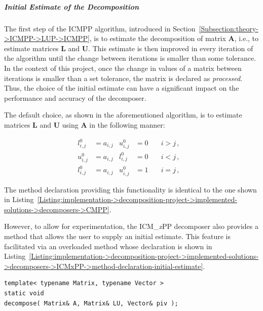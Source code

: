 \subparagraph{Initial Estimate of the Decomposition} The first step of the ICMPP algorithm, introduced in Section~\ref{Subsection:theory->ICMPP->LUP->ICMPP}, is to estimate the decomposition of matrix $\mathbf{A}$, i.e., to estimate matrices $\mathbf{L}$ and $\mathbf{U}$.
This estimate is then improved in every iteration of the algorithm until the change between iterations is smaller than some tolerance.
In the context of this project, once the change in values of a matrix between iterations is smaller than a set tolerance, the matrix is declared as \textit{processed}.
Thus, the choice of the initial estimate can have a significant impact on the performance and accuracy of the decomposer.

The default choice, as shown in the aforementioned algorithm, is to estimate matrices $\mathbf{L}$ and $\mathbf{U}$ using $\mathbf{A}$ in the following manner:

\begin{align}
	l_{i,j}^{0} & = a_{i,j} & u_{i,j}^{0} & = 0 \quad & i > j \nonumber\,, &  \\
	u_{i,j}^{0} & = a_{i,j} & l_{i,j}^{0} & = 0 \quad & i < j \nonumber\,, &  \\
	l_{i,j}^{0} & = a_{i,j} & u_{i,j}^{0} & = 1       & i = j \nonumber\,, &
\end{align}

The method declaration providing this functionality is identical to the one shown in Listing~\ref{Listing:implementation->decomposition-project->implemented-solutions->decomposers->CMPP}.

However, to allow for experimentation, the ICM\_\textit{x}PP decomposer also provides a method that allows the user to supply an initial estimate.
This feature is facilitated via an overloaded method whose declaration is shown in Listing~\ref{Listing:implementation->decomposition-project->implemented-solutions->decomposers->ICMxPP->method-declaration-initial-estimate}.

\begin{lstlisting}[caption={The declaration of the overloaded \code{decompose()} method for the ICM\_\textit{x}PP decomposer that allows the user to supply an initial estimate of the decomposition.
On input, matrix \code{A} is assumed to contain the values of $\mathbf{A}$, matrix \code{LU} is assumed to contain the initial estimate of the decomposition, and \code{piv} is expected to be appropriately sized and allocated on the host.
On output, matrix \code{LU} contains the values of matrices $\mathbf{L}$ and $\mathbf{U}$ in the format presented in Equation~\ref{Equation:implementation->decomposition-project->implemented-solutions->decomposers->CMPP}, and \code{piv} contains the row permutations.},label={Listing:implementation->decomposition-project->implemented-solutions->decomposers->ICMxPP->method-declaration-initial-estimate}]
template< typename Matrix, typename Vector >
static void
decompose( Matrix& A, Matrix& LU, Vector& piv );
\end{lstlisting}


